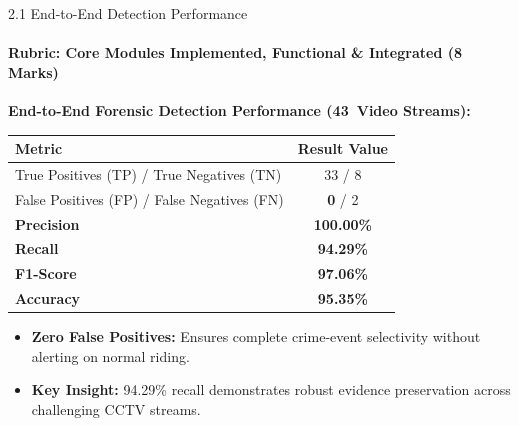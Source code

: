 \documentclass[aspectratio=169, 11pt]{beamer}
\begin{document}
\begin{frame}{2.1 End-to-End Detection Performance}
    \framesubtitle{Rubric: Core Modules Implemented, Functional \& Integrated (8 Marks)}
    \centering
    \textbf{End-to-End Forensic Detection Performance (43~Video Streams):}
    \vspace{0.2cm}
    \begin{table}
        \centering
        \small
        \renewcommand{\arraystretch}{1.1}
        \begin{tabular}{lc}
            \toprule
            \textbf{Metric} & \textbf{Result Value} \\
            \midrule
            True Positives (TP) / True Negatives (TN) & 33 / 8 \\
            False Positives (FP) / False Negatives (FN) & \textbf{0} / 2 \\
            \textbf{Precision} & \textbf{100.00\%} \\
            \textbf{Recall} & \textbf{94.29\%} \\
            \textbf{F1-Score} & \textbf{97.06\%} \\
            \textbf{Accuracy} & \textbf{95.35\%} \\
            \bottomrule
        \end{tabular}
    \end{table}
    \vspace{0.5cm}
    \begin{itemize}
        \item \textbf{Zero False Positives:} Ensures complete crime-event selectivity without alerting on normal riding.
        \item \textbf{Key Insight:} 94.29\% recall demonstrates robust evidence preservation across challenging CCTV streams.
    \end{itemize}
\end{frame}
\end{document}
